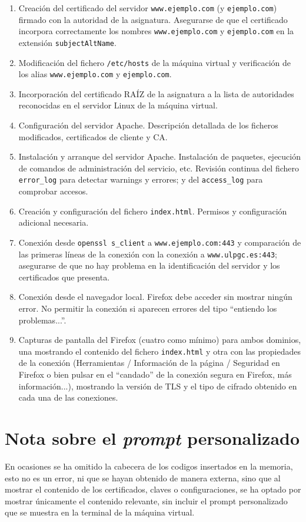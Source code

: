 \begin{enumerate}
    \item Creación del certificado del servidor \texttt{www.ejemplo.com} (y \texttt{ejemplo.com}) firmado con la autoridad de la asignatura. Asegurarse de que el certificado incorpora correctamente los nombres \texttt{www.ejemplo.com} y \texttt{ejemplo.com} en la extensión \texttt{subjectAltName}.
    \item Modificación del fichero \texttt{/etc/hosts} de la máquina virtual y verificación de los alias \texttt{www.ejemplo.com} y \texttt{ejemplo.com}.
    \item Incorporación del certificado RAÍZ de la asignatura a la lista de autoridades reconocidas en el servidor Linux de la máquina virtual.
    \item Configuración del servidor Apache. Descripción detallada de los ficheros modificados, certificados de cliente y CA.
    \item Instalación y arranque del servidor Apache. Instalación de paquetes, ejecución de comandos de administración del servicio, etc. Revisión continua del fichero \texttt{error\_log} para detectar warnings y errores; y del \texttt{access\_log} para comprobar accesos.
    \item Creación y configuración del fichero \texttt{index.html}. Permisos y configuración adicional necesaria.
    \item Conexión desde \texttt{openssl s\_client} a \texttt{www.ejemplo.com:443} y comparación de las primeras líneas de la conexión con la conexión a \texttt{www.ulpgc.es:443}; asegurarse de que no hay problema en la identificación del servidor y los certificados que presenta.
    \item Conexión desde el navegador local. Firefox debe acceder sin mostrar ningún error. No permitir la conexión si aparecen errores del tipo ``entiendo los problemas...''.
    \item Capturas de pantalla del Firefox (cuatro como mínimo) para ambos dominios, una mostrando el contenido del fichero \texttt{index.html} y otra con las propiedades de la conexión (Herramientas / Información de la página / Seguridad en Firefox o bien pulsar en el ``candado'' de la conexión segura en Firefox, más información...), mostrando la versión de TLS y el tipo de cifrado obtenido en cada una de las conexiones.
\end{enumerate}

\section{Nota sobre el \emph{prompt} personalizado}
En ocasiones se ha omitido la cabecera de los codigos insertados en la memoria,
esto no es un error, ni que se hayan obtenido de manera externa, sino que al mostrar el contenido
de los certificados, claves o configuraciones, se ha optado por mostrar únicamente el contenido relevante, 
sin incluir el prompt personalizado que se muestra en la terminal de la máquina virtual. 